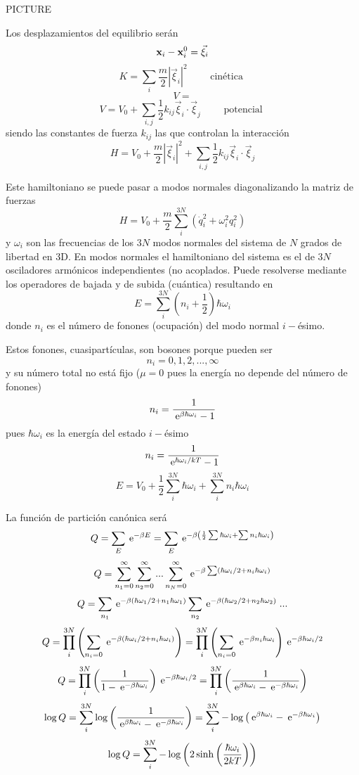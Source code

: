 \documentclass[10pt,oneside]{CBFT_book}
\begin{document}
PICTURE 

Los desplazamientos del equilibrio serán 
\[
	\vb{x}_i - \vb{x}_i^0 = \vec{\xi}_i
\]
\[
	K = \sum_i \frac{m}{2} | \vec{\xi}_i|^2 \qquad \text{ cinética }
\]
\[
	V =
\]
\[
	V = V_0 + \sum_{i,j} \frac{1}{2} k_{ij}  \vec{\xi}_i\cdot  \vec{\xi}_j \qquad \text{ potencial }
\]
siendo las constantes de fuerza $k_{ij}$ las que controlan la interacción 
\[
	H = V_0 + \frac{m}{2} | \vec{\xi}_i|^2  + \sum_{i,j} \frac{1}{2} k_{ij}  \vec{\xi}_i\cdot  \vec{\xi}_j
\]

Este hamiltoniano se puede pasar a modos normales diagonalizando la matriz de fuerzas
\[
	H = V_0 + \frac{m}{2}  \sum_i^{3N} \left( \dot{q}_i^2 + \omega_i^2 q_i^2 \right)
\]
y $\omega_i$ son las frecuencias de los $3N$ modos normales del sistema de $N$ grados de libertad en
3D. En modos normales el hamiltoniano del sistema es el de $3N$ osciladores armónicos independientes
(no acoplados. 
Puede resolverse mediante los operadores de bajada y de subida (cuántica) resultando en
\[
	E = \sum_i^{3N} \left( n_i + \frac{1}{2} \right) \hbar \omega_i
\]
donde $n_i$ es el número de fonones (ocupación) del modo normal $i-$ésimo.

Estos fonones, cuasipartículas, son bosones porque pueden ser 
\[
	n_i = 0,1,2,...,\infty
\]
y su número total no está fijo ($\mu=0$ pues la energía no depende del número de fonones)
\[
	n_i = \frac{1}{\:\mathrm{e}^{\beta\hbar \omega_i} -1 }
\]
pues $\hbar\omega_i$ es la energía del estado $i-$ésimo
\[
	n_i = \frac{1}{\:\mathrm{e}^{ \hbar \omega_i / kT } -1 }
\]
\[
	E = V_0 + \frac{1}{2} \sum_i^{3N} \hbar \omega_i + \sum_i^{3N} n_i \hbar \omega_i
\]

La función de partición canónica será 
\[
	Q = \sum_E \:\mathrm{e}^{ -\beta E } =
	\sum_E \:\mathrm{e}^{ -\beta \left( \frac{1}{2} \sum \hbar \omega_i + \sum n_i \hbar \omega_i \right) }
\]
\[
	Q = \sum_{n_1=0}^\infty \sum_{n_2=0}^\infty ... \sum_{n_N=0}^\infty 
	\:\mathrm{e}^{ -\beta \sum \left( \hbar \omega_i /2  + n_i \hbar \omega_i \right) }
\]
\[
	Q = \sum_{n_1} \:\mathrm{e}^{ -\beta \left( \hbar \omega_1 /2 + n_1 \hbar\omega_1 \right) }
	\sum_{n_2} \:\mathrm{e}^{ -\beta \left( \hbar \omega_2 /2 + n_2 \hbar\omega_2 \right) } \; ...
\]
\[
	Q = \prod_i^{3N} \left(
	\sum_{n_i=0} \:\mathrm{e}^{ -\beta \left( \hbar \omega_i /2 + n_i \hbar\omega_i \right) } 
	\right) = \prod_i^{3N} \left(
	\sum_{n_i=0} \:\mathrm{e}^{ -\beta n_i \hbar\omega_i } \right) \:\mathrm{e}^{ -\beta \hbar \omega_i /2 }
\]
\[
	Q = \prod_i^{3N} \left(
	\frac{1}{1-\:\mathrm{e}^{ -\beta \hbar \omega_i } } \right)  \:\mathrm{e}^{ -\beta \hbar \omega_i /2 } = 
	\prod_i^{3N} \left( \frac{1}{ \:\mathrm{e}^{ \beta \hbar \omega_i } -\:\mathrm{e}^{ -\beta \hbar \omega_i } } \right)
\]
\[
	\log Q = \sum_i^{3N} \log \left( \frac{1}{ \:\mathrm{e}^{ \beta \hbar \omega_i } -\:\mathrm{e}^{ -\beta \hbar \omega_i } } 
	\right) = 
	\sum_i^{3N} - \log \left( { \:\mathrm{e}^{ \beta \hbar \omega_i } -\:\mathrm{e}^{ -\beta \hbar \omega_i } } \right)
\]
\[
	\log Q = \sum_i^{3N} - \log \left( 2 \sinh \left( \frac{ \hbar\omega_i }{ 2kT } \right) \right)
\]
\end{document}
